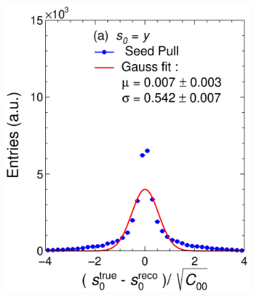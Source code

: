 \begin{figure}[t]
     \centering
     \begin{subfigure}{0.32\textwidth}
         \centering
         \includegraphics[width=\textwidth]{figures/ch5-KF_NDGAr/FullSample/Int/Units/Unit0Seed.eps}
         \caption{}
         \label{fig:resp0SeedGAr_Int}
     \end{subfigure}
     \begin{subfigure}{0.32\textwidth}
         \centering

\end{subfigure}
\end{figure}
